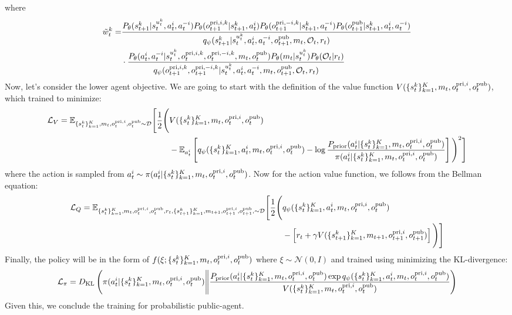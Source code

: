 where 
\begin{equation}
\begin{aligned}
    \tilde{w}_t^k = &\frac{P_\theta(s_{t+1}^k | s_t^{u^k_t}, a_t^i, a_t^{-i})P_\theta(o^{\operatorname{pri}, i, k}_{t+1} | s_{t+1}^k, a^i_t) P_\theta(o^{\operatorname{pri}, -i, k}_{t+1} | s_{t+1}^k, a^{-i}_t) P_\theta(o^{\operatorname{pub}}_{t+1} | s_{t+1}^k, a^i_t, a^{-i}_t)}{q_\psi(s_{t+1}^k | s_t^{u^k_t}, a^i_t, a^{-i}_t, o^{\operatorname{pub}}_{t+1}, m_t, \mathcal{O}_t, r_t)} \\
    &\cdot \frac{P_\theta(a^i_t, a^{-i}_t | s_t^{u^k_t}, o^{\operatorname{pri}, i, k}_t, o^{\operatorname{pri}, -i, k}_t, m_t, o^{\operatorname{pub}}_t) P_\theta(m_t | s_t^{u^k_t}) P_\theta(\mathcal{O}_t | r_t)}{q_\psi(o^{\operatorname{pri}, i, k}_{t+1}, o^{\operatorname{pri}, -i, k}_{t+1} | s_t^{u^k_t}, a^i_t, a^{-i}_t, m_t, o^{\operatorname{pub}}_{t+1}, \mathcal{O}_t, r_t)} 
\end{aligned}
\end{equation}
Now, let's consider the lower agent objective. We are going to start with the definition of the value function $V(\{s_t^k\}^K_{k=1}, m_t, o^{\operatorname{pri}, i}_t, o^{\operatorname{pub}}_t)$, which trained to minimize:
\begin{equation}
\begin{aligned}
\mathcal{L}_{V} = \mathbb{E}_{\{s_t^k\}^K_{k=1}, m_t, o^{\operatorname{pri}, i}_t, o^{\operatorname{pub}}_t\sim \mathcal{D}} \Bigg[\frac{1}{2}\Bigg(&V(\{s_t^k\}^K_{k=1}, m_t, o^{\operatorname{pri}, i}_t, o^{\operatorname{pub}}_t) \\
&- \mathbb{E}_{a_t^i}\left[ q_\psi(\{s_t^k\}^K_{k=1}, a^i_t, m_t, o^{\operatorname{pri}, i}_t, o^{\operatorname{pub}}_t) - \log \frac{P_{\text{prior}}(a^i_t | \{s_t^k\}^K_{k=1}, m_t, o^{\operatorname{pri}, i}_t, o^{\operatorname{pub}}_t)}{\pi(a^i_t | \{s_t^k\}^K_{k=1}, m_t, o^{\operatorname{pri}, i}_t, o^{\operatorname{pub}}_t)} \right]\Bigg)^2\Bigg]
\end{aligned}
\end{equation}
where the action is sampled from $a^i_t \sim \pi(a^i_t | \{s_t^k\}^K_{k=1}, m_t, o^{\operatorname{pri}, i}_t, o^{\operatorname{pub}}_t)$. Now for the action value function, we follows from the Bellman equation:
\begin{equation}
\begin{aligned}
    \mathcal{L}_Q = \mathbb{E}_{\{s_t^k\}^K_{k=1}, m_t, o^{\operatorname{pri}, i}_t, o^{\operatorname{pub}}_t, r_t, \{s_{t+1}^k\}^K_{k=1},m_{t+1}, o^{\operatorname{pri}, i}_{t+1}, o^{\operatorname{pub}}_{t+1},\sim \mathcal{D}}\Bigg[\frac{1}{2}\Bigg( &q_\psi(\{s_t^k\}^K_{k=1}, a^i_t, m_t, o^{\operatorname{pri}, i}_t, o^{\operatorname{pub}}_t)  \\
    &- \left[ r_t + \gamma V(\{s_{t+1}^k\}^K_{k=1}, m_{t+1}, o^{\operatorname{pri}, i}_{t+1}, o^{\operatorname{pub}}_{t+1}) \right] \Bigg)\Bigg]
\end{aligned}
\end{equation}
Finally, the policy will be in the form of $f(\xi ; \{s_t^k\}^K_{k=1}, m_t, o^{\operatorname{pri}, i}_t, o^{\operatorname{pub}}_t)$ where $\xi \sim \mathcal{N}(0, I)$ and trained using minimizing the KL-divergence:
\begin{equation}
    \mathcal{L}_{\pi} = D_{\mathrm{KL}}\left( \pi(a^i_t | \{s_t^k\}^K_{k=1}, m_t, o^{\operatorname{pri}, i}_t, o^{\operatorname{pub}}_t)\Bigg\|\frac{P_{\text{prior}}(a^i_t | \{s_t^k\}^K_{k=1}, m_t, o^{\operatorname{pri}, i}_t, o^{\operatorname{pub}}_t)\exp{q_\psi(\{s_t^k\}^K_{k=1}, a^i_t, m_t, o^{\operatorname{pri}, i}_t, o^{\operatorname{pub}}_t)}}{V(\{s_t^k\}^K_{k=1}, m_t, o^{\operatorname{pri}, i}_t, o^{\operatorname{pub}}_t)} \right)
\end{equation}
Given this, we conclude the training for probabilistic public-agent.
    
